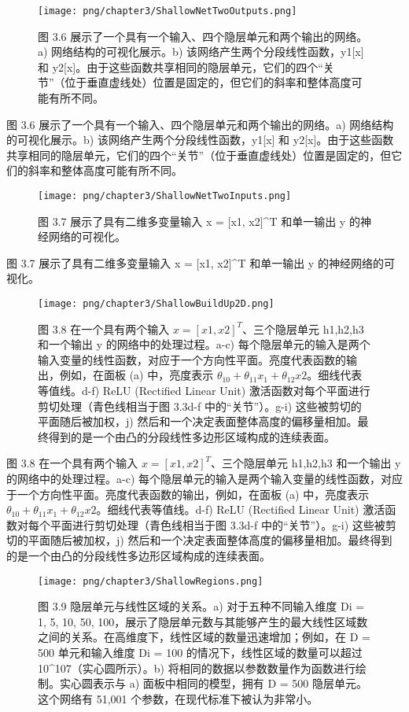 \begin{figure}[h!]
\centering
\texttt{[image: png/chapter3/ShallowNetTwoOutputs.png]}
\caption{图 3.6 展示了一个具有一个输入、四个隐层单元和两个输出的网络。a) 网络结构的可视化展示。b) 该网络产生两个分段线性函数，y1[x] 和 y2[x]。由于这些函数共享相同的隐层单元，它们的四个“关节”（位于垂直虚线处）位置是固定的，但它们的斜率和整体高度可能有所不同。}
\end{figure}

图 3.6 展示了一个具有一个输入、四个隐层单元和两个输出的网络。a) 网络结构的可视化展示。b) 该网络产生两个分段线性函数，y1[x] 和 y2[x]。由于这些函数共享相同的隐层单元，它们的四个“关节”（位于垂直虚线处）位置是固定的，但它们的斜率和整体高度可能有所不同。


\begin{figure}[h!]
\centering
\texttt{[image: png/chapter3/ShallowNetTwoInputs.png]}
\caption{图 3.7 展示了具有二维多变量输入 x = [x1, x2]^T 和单一输出 y 的神经网络的可视化。}
\end{figure}

图 3.7 展示了具有二维多变量输入 x = [x1, x2]^T 和单一输出 y 的神经网络的可视化。


\begin{figure}[h!]
\centering
\texttt{[image: png/chapter3/ShallowBuildUp2D.png]}
\caption{图 3.8 在一个具有两个输入 $x = [x1,x2]^T$、三个隐层单元 h1,h2,h3 和一个输出 y 的网络中的处理过程。a-c) 每个隐层单元的输入是两个输入变量的线性函数，对应于一个方向性平面。亮度代表函数的输出，例如，在面板 (a) 中，亮度表示 $θ_10 + θ_{11}x_1 + θ_{12} x2$。细线代表等值线。d-f) ReLU (Rectified Linear Unit) 激活函数对每个平面进行剪切处理（青色线相当于图 3.3d-f 中的“关节”）。g-i) 这些被剪切的平面随后被加权，j) 然后和一个决定表面整体高度的偏移量相加。最终得到的是一个由凸的分段线性多边形区域构成的连续表面。}
\end{figure}

图 3.8 在一个具有两个输入 \(x = [x1,x2]^T\)、三个隐层单元 h1,h2,h3 和一个输出 y 的网络中的处理过程。a-c) 每个隐层单元的输入是两个输入变量的线性函数，对应于一个方向性平面。亮度代表函数的输出，例如，在面板 (a) 中，亮度表示 \(θ_10 + θ_{11}x_1 + θ_{12} x2\)。细线代表等值线。d-f) ReLU (Rectified Linear Unit) 激活函数对每个平面进行剪切处理（青色线相当于图 3.3d-f 中的“关节”）。g-i) 这些被剪切的平面随后被加权，j) 然后和一个决定表面整体高度的偏移量相加。最终得到的是一个由凸的分段线性多边形区域构成的连续表面。


\begin{figure}[h!]
\centering
\texttt{[image: png/chapter3/ShallowRegions.png]}
\caption{图 3.9 隐层单元与线性区域的关系。a) 对于五种不同输入维度 Di = {1, 5, 10, 50, 100}，展示了隐层单元数与其能够产生的最大线性区域数之间的关系。在高维度下，线性区域的数量迅速增加；例如，在 D = 500 单元和输入维度 Di = 100 的情况下，线性区域的数量可以超过 10^107（实心圆所示）。b) 将相同的数据以参数数量作为函数进行绘制。实心圆表示与 a) 面板中相同的模型，拥有 D = 500 隐层单元。这个网络有 51,001 个参数，在现代标准下被认为非常小。}
\end{figure}

